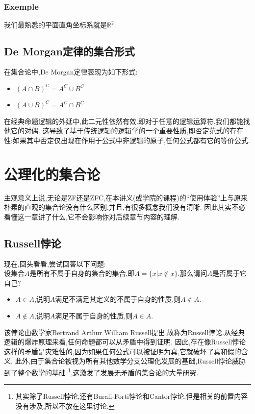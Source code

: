 \documentclass[12pt, a4paper, oneside]{ctexbook}
\newcommand{\R }{\mathbb{R}}%
\begin{document}
  \subsubsection{Exemple}
  我们最熟悉的平面直角坐标系就是$\R^2$.
  \subsection{De Morgan定律的集合形式}
  在集合论中,De Morgan定律表现为如下形式:
  \begin{itemize}
    \item $(A\cap B)^C=A^C\cup B^C $
    \item $(A\cup B)^C=A^C\cap B^C $
  \end{itemize}


  在经典命题逻辑的外延中,此二元性依然有效.即对于任意的逻辑运算符,我们都能找他它的对偶.
  这导致了基于传统逻辑的逻辑学的一个重要性质,即否定范式的存在性:如果其中否定仅出现在作用于公式中非逻辑的原子,任何公式都有它的等价公式.

  \section{公理化的集合论}\label{myref:gonglihua}
  主观意义上说,无论是ZF还是ZFC,在本讲义(或学院的课程)的“使用体验”上与原来朴素的直观的集合论没有什么区别,并且,有很多概念我们没有清晰.
  因此其实不必看懂这一章讲了什么,它不会影响你对后续章节内容的理解.
  \subsection{Russell悖论}
  现在,回头看看,尝试回答以下问题:\\
  设集合$A$是所有不属于自身的集合的集合,即$A=\{x | x\notin x\}$.那么请问$A$是否属于它自己?
  \begin{itemize}
    \item $A\in A$,说明$A$满足不满足其定义的不属于自身的性质,则$A\notin A$.
    \item $A\notin A$,说明$A$满足不属于自身的性质,则$A\in A$.
  \end{itemize}


  该悖论由数学家Bertrand Arthur William Russell提出,故称为Russell悖论.从经典逻辑的爆炸原理来看,任何命题都可以从矛盾中得到证明.
  因此,存在像Russell悖论这样的矛盾是灾难性的,因为如果任何公式可以被证明为真,它就破坏了真和假的含义.
  此外,由于集合论被视为所有其他数学分支公理化发展的基础,Russell悖论威胁到了整个数学的基础
  \footnote{
    其实除了Russell悖论,还有Burali-Forti悖论和Cantor悖论,但是相关的前置内容没有涉及,所以不放在这里讨论.
  },这激发了发展无矛盾的集合论的大量研究.
\end{document}
